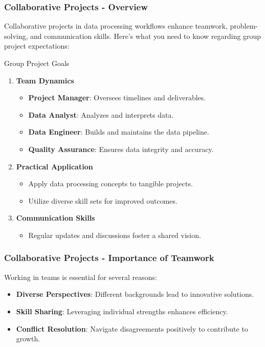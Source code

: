\documentclass[aspectratio=169]{beamer}
\begin{document}
\begin{frame}[fragile]
    \frametitle{Collaborative Projects - Overview}
    Collaborative projects in data processing workflows enhance teamwork, problem-solving, and communication skills. Here’s what you need to know regarding group project expectations:
    
    \begin{block}{Group Project Goals}
        \begin{enumerate}
            \item \textbf{Team Dynamics}
                \begin{itemize}
                    \item \textbf{Project Manager}: Oversees timelines and deliverables.
                    \item \textbf{Data Analyst}: Analyzes and interprets data.
                    \item \textbf{Data Engineer}: Builds and maintains the data pipeline.
                    \item \textbf{Quality Assurance}: Ensures data integrity and accuracy.
                \end{itemize}

            \item \textbf{Practical Application}
                \begin{itemize}
                    \item Apply data processing concepts to tangible projects.
                    \item Utilize diverse skill sets for improved outcomes.
                \end{itemize}

            \item \textbf{Communication Skills}
                \begin{itemize}
                    \item Regular updates and discussions foster a shared vision.
                \end{itemize}
        \end{enumerate}
    \end{block}
\end{frame}

\begin{frame}[fragile]
    \frametitle{Collaborative Projects - Importance of Teamwork}
    Working in teams is essential for several reasons:
    \begin{itemize}
        \item \textbf{Diverse Perspectives}: Different backgrounds lead to innovative solutions.
        \item \textbf{Skill Sharing}: Leveraging individual strengths enhances efficiency.
        \item \textbf{Conflict Resolution}: Navigate disagreements positively to contribute to growth.
    \end{itemize}
\end{frame}
\end{document}
